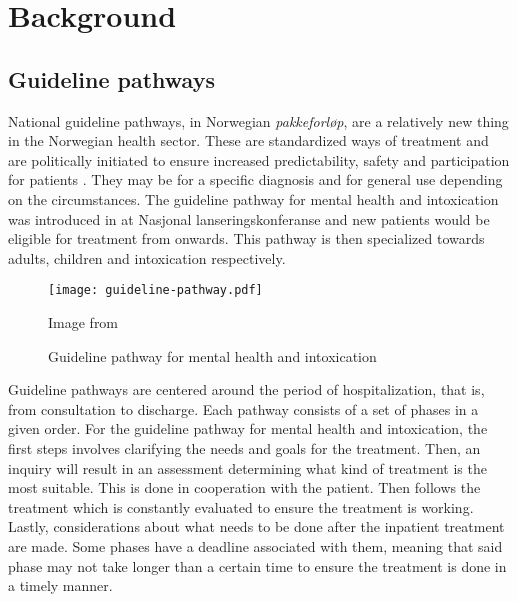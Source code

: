 \chapter{Background}
\label{ch:background}



\section{Guideline pathways}
\label{sec:pathways}

National guideline pathways, in Norwegian \emph{pakkeforløp}, are a relatively new thing in the Norwegian health sector. These are standardized ways of treatment and are politically initiated to ensure increased predictability, safety and participation for patients \parencite{helsedirektoratet2019}. They may be for a specific diagnosis and for general use depending on the circumstances. The guideline pathway for mental health and intoxication was introduced in  at Nasjonal lanseringskonferanse \parencite{haugland2018} and new patients would be eligible for treatment from  onwards. This pathway is then specialized towards adults, children and intoxication respectively. %

\begin{figure}
    \centering
    \texttt{[image: guideline-pathway.pdf]}
    \caption{Guideline pathway for mental health and intoxication}
    Image from \textcite{haugland2018}
    \label{fig:guideline-pathway}
\end{figure}

Guideline pathways are centered around the period of hospitalization, that is, from consultation to discharge. Each pathway consists of a set of phases in a given order. For the guideline pathway for mental health and intoxication, the first steps involves clarifying the needs and goals for the treatment. Then, an inquiry will result in an assessment determining what kind of treatment is the most suitable. This is done in cooperation with the patient. Then follows the treatment which is constantly evaluated to ensure the treatment is working. Lastly, considerations about what needs to be done after the inpatient treatment are made. Some phases have a deadline associated with them, meaning that said phase may not take longer than a certain time to ensure the treatment is done in a timely manner.

